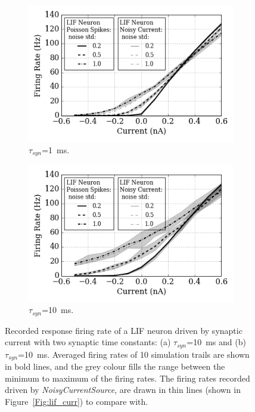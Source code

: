 \documentclass[runningheads,a4paper]{llncs}
\begin{document}
\begin{figure}[tbp!]
	\centering
	\begin{subfigure}[t]{0.49\textwidth}
		\includegraphics[width=\textwidth]{spiked_curve_1.png}
		\caption{$\tau_{syn}$=1~ms.}
	\end{subfigure}
	\begin{subfigure}[t]{0.49\textwidth}
		\includegraphics[width=\textwidth]{spiked_curve_10.png}
		\caption{$\tau_{syn}$=10~ms.}
	\end{subfigure}
	\caption{Recorded response firing rate of a LIF neuron driven by synaptic current with two synaptic time constants: (a) $\tau_{syn}$=10~ms and (b) $\tau_{syn}$=10~ms. Averaged firing rates of 10 simulation trails are shown in bold lines, and the grey colour fills the range between the minimum to maximum of the firing rates. The firing rates recorded driven by \textit{NoisyCurrentSource}, are drawn in thin lines (shown in Figure~\ref{Fig:lif_curr}) to compare with.}
	\label{Fig:spike_curr}
\end{figure}
\end{document}
